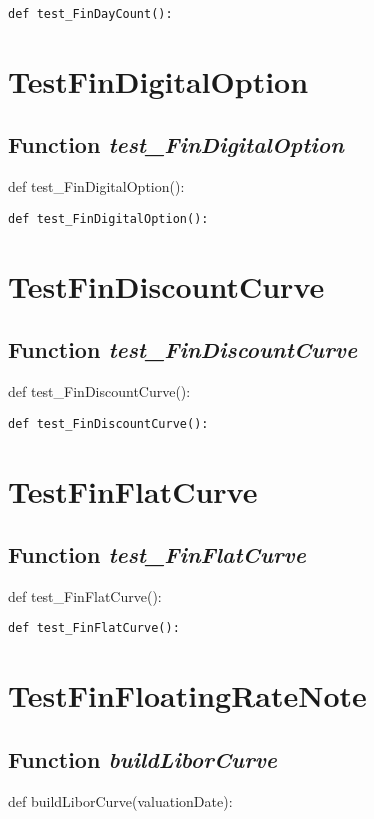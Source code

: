 \documentclass[twoside,11pt]{book}
\begin{document}
\begin{lstlisting}
def test_FinDayCount():
\end{lstlisting}


\newpage
\section{TestFinDigitalOption}

\subsection{Function {\it test\_FinDigitalOption}}
def test\_FinDigitalOption():

\begin{lstlisting}
def test_FinDigitalOption():
\end{lstlisting}


\newpage
\section{TestFinDiscountCurve}

\subsection{Function {\it test\_FinDiscountCurve}}
def test\_FinDiscountCurve():

\begin{lstlisting}
def test_FinDiscountCurve():
\end{lstlisting}


\newpage
\section{TestFinFlatCurve}

\subsection{Function {\it test\_FinFlatCurve}}
def test\_FinFlatCurve():

\begin{lstlisting}
def test_FinFlatCurve():
\end{lstlisting}


\newpage
\section{TestFinFloatingRateNote}

\subsection{Function {\it buildLiborCurve}}
def buildLiborCurve(valuationDate):
\end{document}

